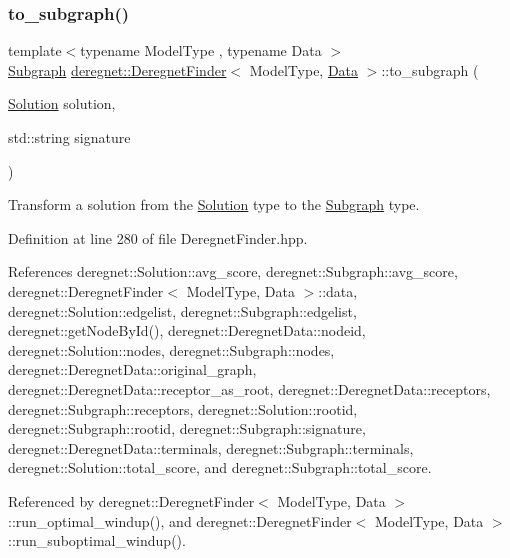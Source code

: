 \subsubsection{\texorpdfstring{to\+\_\+subgraph()}{to\_subgraph()}}
{\footnotesize\ttfamily template$<$typename Model\+Type , typename Data $>$ \\
\hyperlink{structderegnet_1_1Subgraph}{Subgraph} \hyperlink{classderegnet_1_1DeregnetFinder}{deregnet\+::\+Deregnet\+Finder}$<$ Model\+Type, \hyperlink{avgdrgnt_8cpp_a1d1235306db276e9b36acba1db1509e8}{Data} $>$\+::to\+\_\+subgraph (\begin{DoxyParamCaption}\item[{\hyperlink{structderegnet_1_1Solution}{Solution}}]{solution,  }\item[{std\+::string}]{signature }\end{DoxyParamCaption})}



Transform a solution from the \hyperlink{structderegnet_1_1Solution}{Solution} type to the \hyperlink{structderegnet_1_1Subgraph}{Subgraph} type. 



Definition at line 280 of file Deregnet\+Finder.\+hpp.



References deregnet\+::\+Solution\+::avg\+\_\+score, deregnet\+::\+Subgraph\+::avg\+\_\+score, deregnet\+::\+Deregnet\+Finder$<$ Model\+Type, Data $>$\+::data, deregnet\+::\+Solution\+::edgelist, deregnet\+::\+Subgraph\+::edgelist, deregnet\+::get\+Node\+By\+Id(), deregnet\+::\+Deregnet\+Data\+::nodeid, deregnet\+::\+Solution\+::nodes, deregnet\+::\+Subgraph\+::nodes, deregnet\+::\+Deregnet\+Data\+::original\+\_\+graph, deregnet\+::\+Deregnet\+Data\+::receptor\+\_\+as\+\_\+root, deregnet\+::\+Deregnet\+Data\+::receptors, deregnet\+::\+Subgraph\+::receptors, deregnet\+::\+Solution\+::rootid, deregnet\+::\+Subgraph\+::rootid, deregnet\+::\+Subgraph\+::signature, deregnet\+::\+Deregnet\+Data\+::terminals, deregnet\+::\+Subgraph\+::terminals, deregnet\+::\+Solution\+::total\+\_\+score, and deregnet\+::\+Subgraph\+::total\+\_\+score.



Referenced by deregnet\+::\+Deregnet\+Finder$<$ Model\+Type, Data $>$\+::run\+\_\+optimal\+\_\+windup(), and deregnet\+::\+Deregnet\+Finder$<$ Model\+Type, Data $>$\+::run\+\_\+suboptimal\+\_\+windup().



